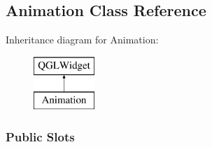\hypertarget{classAnimation}{}\subsection{Animation Class Reference}
\label{classAnimation}
Inheritance diagram for Animation\+:\begin{figure}[H]
\begin{center}
\leavevmode
\includegraphics[height=2.000000cm]{classAnimation}
\end{center}
\end{figure}
\subsubsection*{Public Slots}
